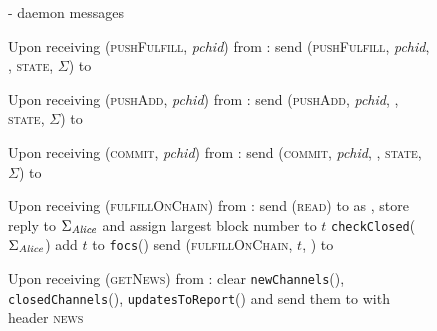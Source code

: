   \begin{figure}[H]
    \begin{systembox}{\fpaynet - daemon messages}
      \begin{algorithmic}[1]
        \State Upon receiving (\textsc{pushFulfill}, \textit{pchid}) from
        \alice:
        \Indent
          \State send (\textsc{pushFulfill}, \textit{pchid}, \alice,
          \textsc{state}, $\Sigma$) to \simulator
          \label{alg:fpaynet:daemon:fulfill}
        \EndIndent
        \Statex

        \State Upon receiving (\textsc{pushAdd}, \textit{pchid}) from \alice:
        \Indent
          \State send (\textsc{pushAdd}, \textit{pchid}, \alice, \textsc{state},
          $\Sigma$) to \simulator
          \label{alg:fpaynet:daemon:add}
        \EndIndent
        \Statex

        \State Upon receiving (\textsc{commit}, \textit{pchid}) from \alice:
        \Indent
          \State send (\textsc{commit}, \textit{pchid}, \alice, \textsc{state},
          $\Sigma$) to \simulator
          \label{alg:fpaynet:daemon:commit}
        \EndIndent
        \Statex

        \State Upon receiving (\textsc{fulfillOnChain}) from \alice:
        \Indent
          \State send (\textsc{read}) to \ledger{} as \alice{}, store reply to
          $\Sigma_{\mathit{Alice}}$ and assign largest block number to $t$
          \State \texttt{checkClosed}($\Sigma_{\mathit{Alice}}$)
          \label{alg:fpaynet:daemon:foc:read}
          \State add $t$ to \texttt{focs}(\alice)
          \State send (\textsc{fulfillOnChain}, $t$, \alice) to \simulator
        \EndIndent
        \Statex

        \State Upon receiving (\textsc{getNews}) from \alice:
        \Indent
          \State clear \texttt{newChannels}(\alice),
          \texttt{closedChannels}(\alice), \texttt{updatesToReport}(\alice) and
          send them to \alice{} with header \textsc{news}
        \EndIndent
      \end{algorithmic}
    \end{systembox}
    \caption{}
    \label{alg:fpaynet:daemon}
  \end{figure}

